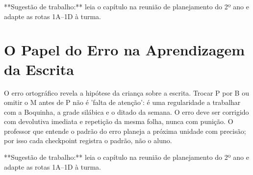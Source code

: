 \begin{dica}
**Sugestão de trabalho:** leia o capítulo na reunião de planejamento do 2º ano e adapte as rotas 1A–1D à turma.
\end{dica}

\chapter{O Papel do Erro na Aprendizagem da Escrita}

O erro ortográfico revela a hipótese da criança sobre a escrita. Trocar P por B ou omitir o M antes de P não é 'falta de atenção': é uma regularidade a trabalhar com a Boquinha, a grade silábica e o ditado da semana. O erro deve ser corrigido com devolutiva imediata e repetição da mesma folha, nunca com punição. O professor que entende o padrão do erro planeja a próxima unidade com precisão; por isso cada checkpoint registra o padrão, não o aluno.


\begin{dica}
**Sugestão de trabalho:** leia o capítulo na reunião de planejamento do 2º ano e adapte as rotas 1A–1D à turma.
\end{dica}
